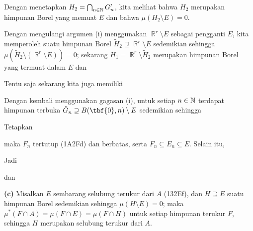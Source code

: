 {

\noindent Dengan menetapkan $H_2=\bigcap_{n\in\Bbb N}G'_n$, kita melihat
bahwa $H_2$ merupakan himpunan Borel yang memuat $E$ dan bahwa
$\mu(H_2\setminus E)=0$.

\medskip

 Dengan mengulangi argumen (i) menggunakan
$\BbbR^r\setminus E$ sebagai pengganti $E$, kita memperoleh suatu himpunan
Borel $\tilde H_2\supseteq\BbbR^r\setminus E$ sedemikian sehingga
$\mu(\tilde H_2\setminus(\BbbR^r\setminus E))=0$; sekarang
$H_1=\BbbR^r\setminus \tilde H_2$ merupakan himpunan Borel yang termuat
dalam $E$ dan


\noindent Tentu saja sekarang kita juga memiliki


\medskip

 Dengan kembali menggunakan gagasan (i), untuk setiap
$n\in\Bbb N$ terdapat himpunan terbuka
$\tilde G_n\supseteq B(\tbf{0},n)\setminus E$ sedemikian sehingga


\noindent Tetapkan


\noindent maka $F_n$ tertutup (1A2Fd) dan berbatas, serta
$F_n\subseteq E_n\subseteq E$. Selain itu,


\noindent Jadi


\noindent dan


\medskip

{\bf (c)} Misalkan $E$ sembarang selubung terukur dari $A$ (132Ef), dan
$H\supseteq E$ suatu himpunan Borel sedemikian sehingga
$\mu(H\setminus E)=0$; maka
$\mu^*(F\cap A)=\mu(F\cap E)=\mu(F\cap H)$ untuk setiap himpunan terukur
$F$, sehingga $H$ merupakan selubung terukur dari $A$.

}
